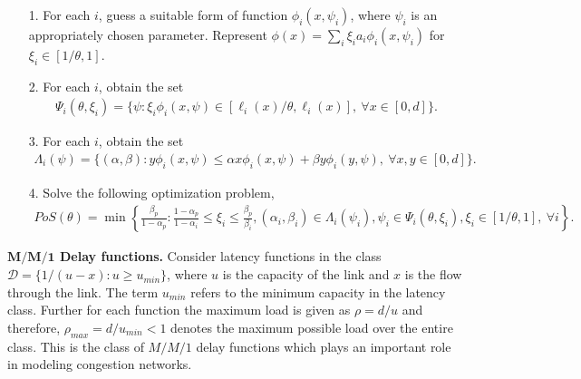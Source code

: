 \begin{itemize}
\item[1.] For each $i$, guess a suitable form of function $\phi_i(x, \psi_i)$, where $\psi_i$ is an appropriately chosen parameter. Represent $\phi(x)= \sum_i \xi_i a_i\phi_i(x, \psi_i)$  for $\xi_i \in [1/\theta,1]$.
\item[2.] For each $i$, obtain the set 
\begin{align*}
\Psi_i(\theta,\xi_i) = \{\psi: \xi_i\phi_i(x, \psi) \in [\ell_i(x)/\theta, \ell_i(x)],~\forall x \in [0,d] \}.
\end{align*}
\item[3.] For each $i$, obtain the set 
\begin{align*}
\Lambda_i(\psi) = \{(\alpha, \beta): y \phi_i(x, \psi) \leq \alpha x \phi_i(x, \psi)  + \beta y \phi_i(y, \psi),~\forall x,y \in [0,d]\}.
\end{align*}
\item[4.] Solve the following optimization problem,
\begin{align*}
\label{eq:designPoS}
PoS(\theta)= \min \left\{\frac{\beta_p}{1-\alpha_p}:  \frac{1-\alpha_p}{1-\alpha_i} \leq \xi_i \leq \frac{\beta_p}{\beta_i},(\alpha_i,\beta_i) \in \Lambda_i(\psi_i), \psi_i \in \Psi_i(\theta,\xi_i), \xi_i \in [1/\theta,1], ~\forall i\right\}.
\end{align*}
\end{itemize}





\smallskip\noindent\textbf{$\bm{M/M/1}$ Delay functions.}
Consider latency functions in the class $\mathcal{D} =\{1/(u-x): u\geq u_{min}\}$, where $u$ is the capacity of the link and $x$ is the flow through the link. The term $u_{min}$ refers to the minimum capacity in the latency class. Further for each function the maximum load is given as $\rho = d/u$ and therefore, $\rho_{max} = d/ u_{min} < 1$ denotes the maximum possible load over the entire class. This is the class of $M/M/1$ delay functions which plays an important role in modeling congestion networks. 
  
